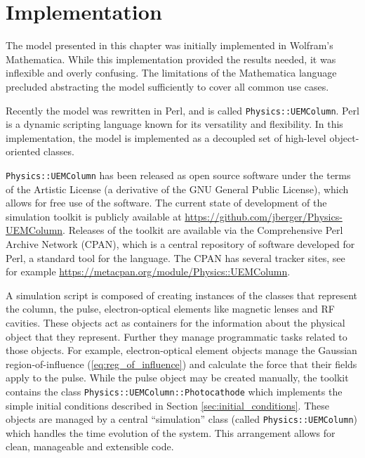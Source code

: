 \section{Implementation}



The model presented in this chapter was initially implemented in Wolfram's Mathematica.
While this implementation provided the results needed, it was inflexible and overly confusing.
The limitations of the Mathematica language precluded abstracting the model sufficiently to cover all common use cases.

Recently the model was rewritten in Perl, and is called \verb!Physics::UEMColumn!.
Perl is a dynamic scripting language known for its versatility and flexibility.
In this implementation, the model is implemented as a decoupled set of high-level object-oriented classes.

\verb!Physics::UEMColumn! has been released as open source software under the terms of the Artistic License (a derivative of the GNU General Public License), which allows for free use of the software.
The current state of development of the simulation toolkit is publicly available at \url{https://github.com/jberger/Physics-UEMColumn}.
Releases of the toolkit are available via the Comprehensive Perl Archive Network (CPAN), which is a central repository of software developed for Perl, a standard tool for the language.
The CPAN has several tracker sites, see for example \url{https://metacpan.org/module/Physics::UEMColumn}.

A simulation script is composed of creating instances of the classes that represent the column, the pulse, electron-optical elements like magnetic lenses and RF cavities.
These objects act as containers for the information about the physical object that they represent.
Further they manage programmatic tasks related to those objects.
For example, electron-optical element objects manage the Gaussian region-of-influence (\ref{eq:reg_of_influence}) and calculate the force that their fields apply to the pulse.
While the pulse object may be created manually, the toolkit contains the class \verb!Physics::UEMColumn::Photocathode! which implements the simple initial conditions described in Section \ref{sec:initial_conditions}.
These objects are managed by a central ``simulation'' class (called \verb!Physics::UEMColumn!) which handles the time evolution of the system.
This arrangement allows for clean, manageable and extensible code.

